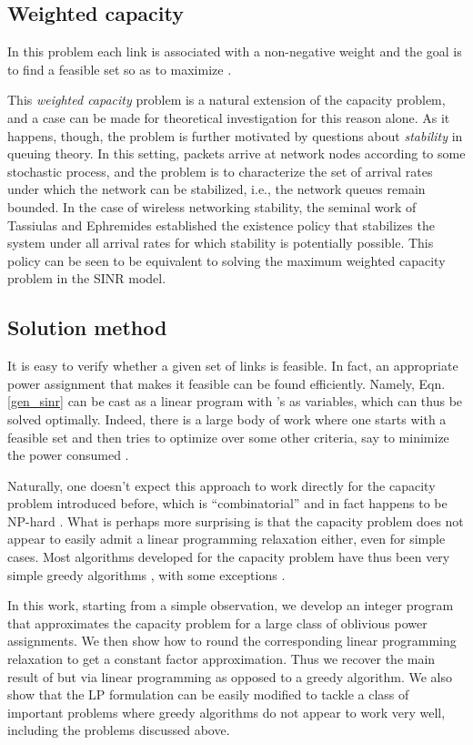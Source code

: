\documentclass[11pt]{amsart}
\begin{document}
\subsection*{Weighted capacity}
In this problem each link  is associated with a non-negative weight  and the goal is to find a feasible
set  so as to maximize .

This \emph{weighted capacity} problem is a natural extension of the capacity problem, and a case can
be made for theoretical investigation for this reason alone.
As it happens, though, the problem is further motivated by questions about \emph{stability} in queuing theory. 
In this setting, packets arrive at network nodes according to some stochastic process, and the problem is
to characterize the set of arrival rates under which the network can be stabilized, i.e., the network queues
remain bounded. In the case of 
wireless networking stability, the seminal work of Tassiulas and Ephremides \cite{TE92} 
established
the existence policy that
stabilizes the system under all arrival rates for which stability is potentially possible. 
This policy can be seen to be equivalent to solving the maximum
weighted capacity problem in the SINR model. 

\subsection*{Solution method}

It is easy to verify whether a given set of links is feasible. 
In fact, an appropriate power assignment that makes it feasible can be found efficiently. Namely, Eqn. \ref{gen_sinr} can be cast as a linear program with 's as variables, 
which can thus be solved optimally. Indeed, there is a large body of work where one starts with a feasible set and then tries to optimize over some other criteria, say to minimize the power consumed \cite{ChiangSurvey}. 

Naturally, one doesn't expect this approach to work directly for the capacity problem introduced before, which is  ``combinatorial'' and in fact happens to be NP-hard \cite{Goussevskaia2008Complexity}.
What is perhaps more surprising is that the capacity problem does not appear to easily admit a linear
programming relaxation either, even for simple cases. Most algorithms developed for the capacity problem have thus been very simple greedy algorithms \cite{GHWW09,SODA11,KesselheimSoda11}, with some exceptions \cite{hoeferspaa,CKMPS08}.

In this work, starting from a simple observation, we develop an integer program that approximates the capacity problem for a large class of oblivious power assignments.
We then show how to round the corresponding linear programming relaxation to get a constant factor approximation.
Thus we recover the main result of \cite{SODA11} but via linear programming as opposed to a greedy algorithm. 
We also show that the LP formulation can be easily modified to tackle a class of important problems where
greedy algorithms do not appear to work very well, including the
problems discussed above.
\end{document}
